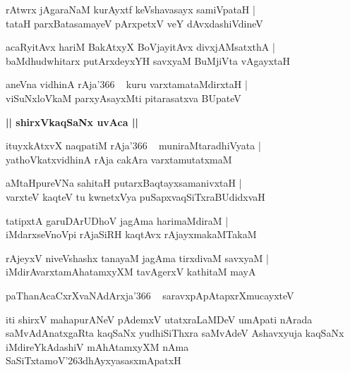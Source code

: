\documentclass[twoside,12pt,openright]{book}
\def\S{\char'263}
\newcounter{shloka}[chapter]
\def\uvaca#1{\centerline{{\large\textbf{#1}}}}
\begin{document}
\begin{shloka}%
rAtwrx jAgaraNaM kurAyxtf keVshavasayx samiVpataH |\\
tataH parxBatasamayeV pArxpetxV veY dAvxdashiVdineV
\end{shloka}

\begin{shloka}%
acaRyitAvx hariM BakAtxyX BoVjayitAvx divxjAMsatxthA |\\
baMdhudwhitarx putArxdeyxYH savxyaM BuMjiVta vAgayxtaH 
\end{shloka}

\begin{shloka}%
aneVna vidhinA rAja\char'366 ~ kuru varxtamataMdirxtaH |\\
viSuNxloVkaM parxyAsayxMti pitarasatxva BUpateV 
\end{shloka}

\uvaca{|| shirxVkaqSaNx uvAca ||}

\begin{shloka}%
ituyxkAtxvX naqpatiM rAja\char'366 ~ muniraMtaradhiVyata |\\
yathoVkatxvidhinA rAja cakAra varxtamutatxmaM 
\end{shloka}

\begin{shloka}%
aMtaHpureVNa sahitaH putarxBaqtayxsamanivxtaH |\\
varxteV kaqteV tu kwnetxVya puSapxvaqSiTxraBUdidxvaH
\end{shloka}

\begin{shloka}%
tatipxtA garuDArUDhoV jagAma harimaMdiraM |\\
iMdarxseVnoVpi rAjaSiRH kaqtAvx rAjayxmakaMTakaM 
\end{shloka}

\begin{shloka}%
rAjeyxV niveVshashx tanayaM jagAma tirxdivaM savxyaM |\\
iMdirAvarxtamAhatamxyXM tavAgerxV kathitaM mayA 
\end{shloka}

\begin{shloka}%
paThanAcaCxrXvaNAdArxja\char'366 ~ saravxpApAtapxrXmucayxteV 
\end{shloka}

\begin{center}
iti shirxV mahapurANeV pAdemxV utatxraLaMDeV umApati nArada saMvAdAnatxgaRta kaqSaNx yudhiSiThxra 
saMvAdeV Ashavxyuja kaqSaNx iMdireYkAdashiV mAhAtamxyXM nAma SaSiTxtamoV\S dhAyxyasasxmApatxH
\end{center}
\end{document}
